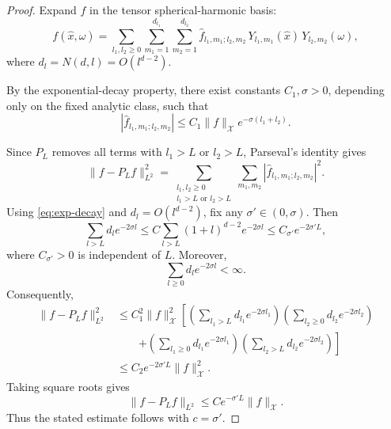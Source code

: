 \documentclass{article}
\numberwithin{equation}{section}
\theoremstyle{plain}
\begin{document}
	\begin{proof}
		Expand $f$ in the tensor spherical-harmonic basis:
		\begin{equation*}
		f(\hat x,\omega)
		=\sum_{l_1,l_2\ge0}\sum_{m_1=1}^{d_{l_1}}\sum_{m_2=1}^{d_{l_2}}
		\hat f_{l_1,m_1;l_2,m_2}\,
		Y_{l_1,m_1}(\hat x)\,Y_{l_2,m_2}(\omega),
		\end{equation*}
		where $d_l=N(d,l)=O(l^{d-2})$.
		
		By the exponential-decay property, there exist constants $C_1,\sigma>0$, depending only on the fixed analytic class, such that
		\begin{equation}\label{eq:exp-decay}
			|\hat f_{l_1,m_1;l_2,m_2}|
			\le
			C_1\|f\|_{\mathcal X}
			e^{-\sigma(l_1+l_2)}.
		\end{equation}
		
		Since $P_L$ removes all terms with $l_1>L$ or $l_2>L$, Parseval's identity gives
		\begin{equation*}
		\|f-P_L f\|_{L^2}^2
		=\sum_{\substack{l_1,l_2\ge0\\ l_1>L\text{ or }l_2>L}}
		\sum_{m_1,m_2}|\hat f_{l_1,m_1;l_2,m_2}|^2.
		\end{equation*}
			Using \eqref{eq:exp-decay} and $d_l=O(l^{d-2})$, fix any
			$\sigma'\in(0,\sigma)$. Then
			\begin{equation*}
				\sum_{l>L} d_l e^{-2\sigma l}
				\le
				C\sum_{l>L}(1+l)^{d-2}e^{-2\sigma l}
				\le
				C_{\sigma'}e^{-2\sigma' L},
			\end{equation*}
			where $C_{\sigma'}>0$ is independent of $L$. Moreover,
			\begin{equation*}
				\sum_{l\ge0}d_l e^{-2\sigma l}<\infty.
			\end{equation*}
			Consequently,
			\begin{equation*}
				\begin{aligned}
					\|f-P_L f\|_{L^2}^2
					&\le
					C_1^2\|f\|_{\mathcal X}^2
					\left[
					\left(\sum_{l_1>L}d_{l_1}e^{-2\sigma l_1}\right)
					\left(\sum_{l_2\ge0}d_{l_2}e^{-2\sigma l_2}\right)
					\right.\\
					&\qquad\left.
					+
					\left(\sum_{l_1\ge0}d_{l_1}e^{-2\sigma l_1}\right)
					\left(\sum_{l_2>L}d_{l_2}e^{-2\sigma l_2}\right)
					\right] \\
					&\le
					C_2e^{-2\sigma' L}\|f\|_{\mathcal X}^2 .
				\end{aligned}
			\end{equation*}
			Taking square roots gives
			\begin{equation*}
				\|f-P_L f\|_{L^2}
				\le
				C e^{-\sigma' L}\|f\|_{\mathcal X}.
			\end{equation*}
			Thus the stated estimate follows with $c=\sigma'$.
	\end{proof}
	
\end{document}
